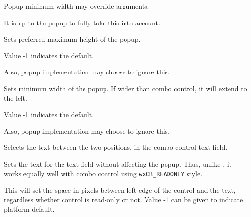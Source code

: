 
Popup minimum width may override arguments.

It is up to the popup to fully take this into account.


\label{wxcomboctrlsetpopupmaxheight}


Sets preferred maximum height of the popup.


Value -1 indicates the default.

Also, popup implementation may choose to ignore this.


\label{wxcomboctrlsetpopupminwidth}


Sets minimum width of the popup. If wider than combo control, it will extend to the left.


Value -1 indicates the default.

Also, popup implementation may choose to ignore this.


\label{wxcomboctrlsetselection}


Selects the text between the two positions, in the combo control text field.





\label{wxcomboctrlsettext}


Sets the text for the text field without affecting the
popup. Thus, unlike , it works
equally well with combo control using {\tt wxCB\_READONLY} style.


\label{wxcomboctrlsettextindent}


This will set the space in pixels between left edge of the control and the
text, regardless whether control is read-only or not. Value -1 can be
given to indicate platform default.



